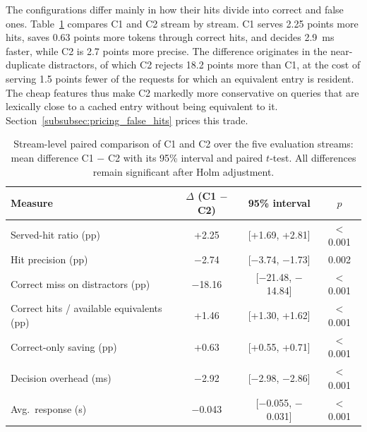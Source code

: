 \documentclass[authoryear,preprint,review,12pt]{elsarticle}
\begin{document}
The configurations differ mainly in how their hits divide into correct and false ones. Table~\ref{tab:c1_c2_paired} compares C1 and C2 stream by stream. C1 serves 2.25 points more hits, saves 0.63 points more tokens through correct hits, and decides 2.9~ms faster, while C2 is 2.7 points more precise. The difference originates in the near-duplicate distractors, of which C2 rejects 18.2 points more than C1, at the cost of serving 1.5 points fewer of the requests for which an equivalent entry is resident. The cheap features thus make C2 markedly more conservative on queries that are lexically close to a cached entry without being equivalent to it. Section~\ref{subsubsec:pricing_false_hits} prices this trade.

\begin{table}[htbp]
\centering
\caption{Stream-level paired comparison of C1 and C2 over the five evaluation streams: mean difference C1 $-$ C2 with its 95\% interval and paired $t$-test. All differences remain significant after Holm adjustment.}
\label{tab:c1_c2_paired}
\footnotesize
\begin{tabular}{lccc}
\toprule
Measure & $\Delta$ (C1 $-$ C2) & 95\% interval & $p$ \\
\midrule
Served-hit ratio (pp) & +2.25 & [+1.69, +2.81] & $<$0.001 \\
Hit precision (pp) & $-$2.74 & [$-$3.74, $-$1.73] & 0.002 \\
Correct miss on distractors (pp) & $-$18.16 & [$-$21.48, $-$14.84] & $<$0.001 \\
Correct hits / available equivalents (pp) & +1.46 & [+1.30, +1.62] & $<$0.001 \\
Correct-only saving (pp) & +0.63 & [+0.55, +0.71] & $<$0.001 \\
Decision overhead (ms) & $-$2.92 & [$-$2.98, $-$2.86] & $<$0.001 \\
Avg.\ response (s) & $-$0.043 & [$-$0.055, $-$0.031] & $<$0.001 \\
\bottomrule
\end{tabular}
\end{table}
\end{document}
